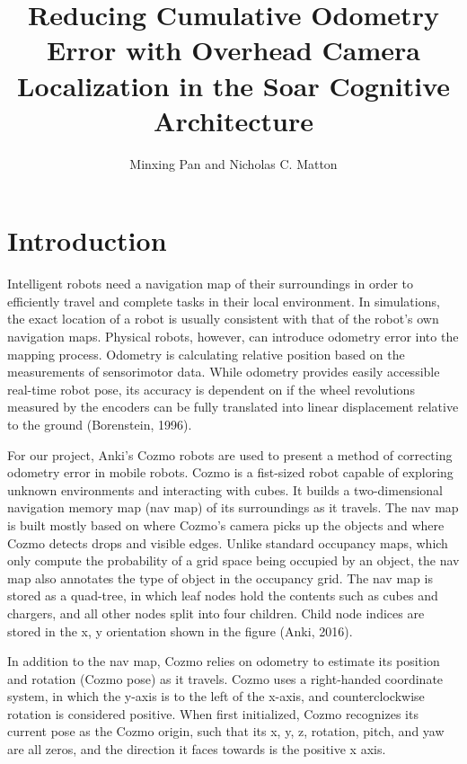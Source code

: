 \documentclass[jou,apacite]{apa6}
\title{Reducing Cumulative Odometry Error with Overhead Camera Localization in the Soar Cognitive Architecture}
\author{Minxing Pan and Nicholas C. Matton}
\affiliation{The University of Michigan}
\begin{document}
\maketitle

\section{Introduction}
Intelligent robots need a navigation map of their surroundings in order to efficiently travel and complete tasks in their local environment. In simulations, the exact location of a robot is usually consistent with that of the robot’s own navigation maps. Physical robots, however, can introduce odometry error into the mapping process. Odometry is calculating relative position based on the measurements of sensorimotor data. While odometry provides easily accessible real-time robot pose, its accuracy is dependent on if the wheel revolutions measured by the encoders can be fully translated into linear displacement relative to the ground (Borenstein, 1996).

For our project, Anki’s Cozmo robots are used to present a method of correcting odometry error in mobile robots. Cozmo is a fist-sized robot capable of exploring unknown environments and interacting with cubes. It builds a two-dimensional navigation memory map (nav map) of its surroundings as it travels. The nav map is built mostly based on where Cozmo’s camera picks up the objects and where Cozmo detects drops and visible edges. Unlike standard occupancy maps, which only compute the probability of a grid space being occupied by an object, the nav map also annotates the type of object in the occupancy grid. The nav map is stored as a quad-tree, in which leaf nodes hold the contents such as cubes and chargers, and all other nodes split into four children. Child node indices are stored in the x, y orientation shown in the figure (Anki, 2016).

In addition to the nav map, Cozmo relies on odometry to estimate its position and rotation (Cozmo pose) as it travels. Cozmo uses a right-handed coordinate system, in which the y-axis is to the left of the x-axis, and counterclockwise rotation is considered positive. When first initialized, Cozmo recognizes its current pose as the Cozmo origin, such that its x, y, z, rotation, pitch, and yaw are all zeros, and the direction it faces towards is the positive x axis. 
\end{document}
